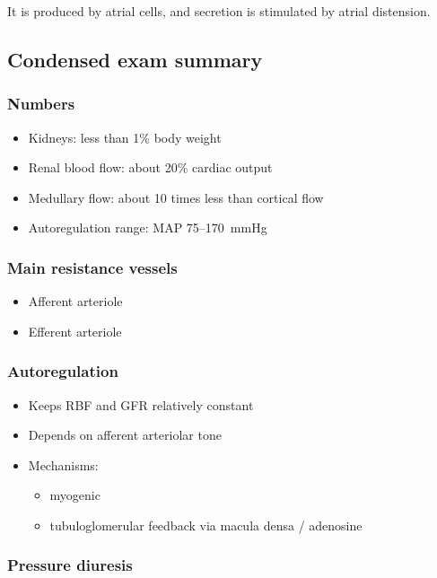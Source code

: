 \documentclass[11pt,a4paper]{article}
\begin{document}
It is produced by atrial cells, and secretion is stimulated by atrial distension.

\subsection{Condensed exam summary}

\subsubsection{Numbers}

\begin{itemize}
    \item Kidneys: less than 1\% body weight
    \item Renal blood flow: about 20\% cardiac output
    \item Medullary flow: about 10 times less than cortical flow
    \item Autoregulation range: MAP 75--170~mmHg
\end{itemize}

\subsubsection{Main resistance vessels}

\begin{itemize}
    \item Afferent arteriole
    \item Efferent arteriole
\end{itemize}

\subsubsection{Autoregulation}

\begin{itemize}
    \item Keeps RBF and GFR relatively constant
    \item Depends on afferent arteriolar tone
    \item Mechanisms:
    \begin{itemize}
        \item myogenic
        \item tubuloglomerular feedback via macula densa / adenosine
    \end{itemize}
\end{itemize}

\subsubsection{Pressure diuresis}
\end{document}
